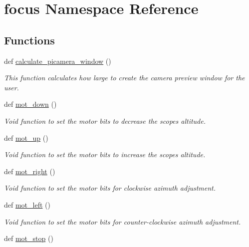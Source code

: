 \hypertarget{namespacefocus}{}\section{focus Namespace Reference}
\label{namespacefocus}
\subsection*{Functions}
\begin{DoxyCompactItemize}
\item 
def \hyperlink{namespacefocus_ace593fb72d9a91bc93d3a25614a365d0}{calculate\+\_\+picamera\+\_\+window} ()
\begin{DoxyCompactList}\small\item\em This function calculates how large to create the camera preview window for the user. \end{DoxyCompactList}\item 
def \hyperlink{namespacefocus_ab92c9c6869b0af6ce3a5920ef8554190}{mot\+\_\+down} ()
\begin{DoxyCompactList}\small\item\em Void function to set the motor bits to decrease the scope\textquotesingle{}s altitude. \end{DoxyCompactList}\item 
def \hyperlink{namespacefocus_ad0102bfe821a43392640e33721246a8c}{mot\+\_\+up} ()
\begin{DoxyCompactList}\small\item\em Void function to set the motor bits to increase the scope\textquotesingle{}s altitude. \end{DoxyCompactList}\item 
def \hyperlink{namespacefocus_a9939d6f9388d8eb82625bd8e3af6f894}{mot\+\_\+right} ()
\begin{DoxyCompactList}\small\item\em Void function to set the motor bits for clockwise azimuth adjustment. \end{DoxyCompactList}\item 
def \hyperlink{namespacefocus_ace370021c60f38a82ce96e69a482cbe3}{mot\+\_\+left} ()
\begin{DoxyCompactList}\small\item\em Void function to set the motor bits for counter-\/clockwise azimuth adjustment. \end{DoxyCompactList}\item 
def \hyperlink{namespacefocus_a19641d526d4c19ab6b10fc8ca9e8fe86}{mot\+\_\+stop} ()

\end{DoxyCompactItemize}
